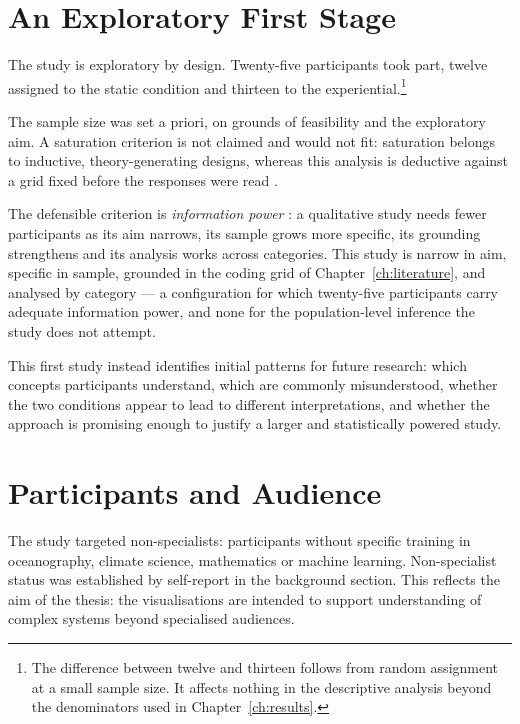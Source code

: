 \section{An Exploratory First Stage}
\label{sec:eval-exploratory}

The study is exploratory by design. Twenty-five participants took part, twelve assigned to the static condition and thirteen to the experiential.\footnote{The difference between twelve and thirteen follows from random assignment at a small sample size. It affects nothing in the descriptive analysis beyond the denominators used in Chapter~\ref{ch:results}.}

The sample size was set a priori, on grounds of feasibility and the exploratory aim. A saturation criterion is not claimed and would not fit: saturation belongs to inductive, theory-generating designs, whereas this analysis is deductive against a grid fixed before the responses were read \citep{braunclarke2021}.

The defensible criterion is \emph{information power} \citep{malterud2016}: a qualitative study needs fewer participants as its aim narrows, its sample grows more specific, its grounding strengthens and its analysis works across categories. This study is narrow in aim, specific in sample, grounded in the coding grid of Chapter~\ref{ch:literature}, and analysed by category --- a configuration for which twenty-five participants carry adequate information power, and none for the population-level inference the study does not attempt.

This first study instead identifies initial patterns for future research: which concepts participants understand, which are commonly misunderstood, whether the two conditions appear to lead to different interpretations, and whether the approach is promising enough to justify a larger and statistically powered study.

\section{Participants and Audience}
\label{sec:eval-audience}

The study targeted non-specialists: participants without specific training in oceanography, climate science, mathematics or machine learning. Non-specialist status was established by self-report in the background section. This reflects the aim of the thesis: the visualisations are intended to support understanding of complex systems beyond specialised audiences.

